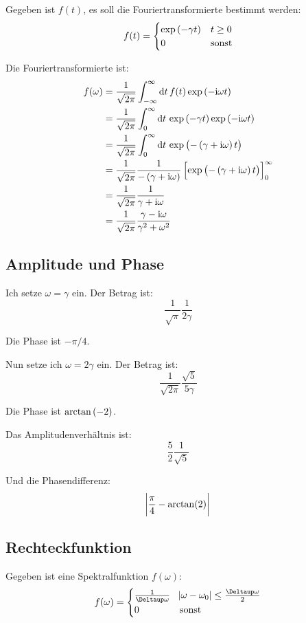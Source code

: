 Gegeben ist $f(t)$, es soll die Fouriertransformierte bestimmt werden:
\[
	f(t) = \begin{cases}
		\exp\del{-\gamma t} & t \geq 0 \\
									  0 & \text{sonst}
	\end{cases}
\]

Die Fouriertransformierte ist:
\begin{align*}
	f(\omega)
	&= \frac{1}{\sqrt{2 \pi}} \int_{-\infty}^\infty \dif t \, f(t) \exp\del{-\ii \omega t} \\
	&= \frac{1}{\sqrt{2 \pi}} \int_0^\infty \dif t \, \exp\del{-\gamma t} \exp\del{-\ii \omega t} \\
	&= \frac{1}{\sqrt{2 \pi}} \int_0^\infty \dif t \, \exp\del{-\del{\gamma + \ii \omega} t} \\
	&= \frac{1}{\sqrt{2 \pi}} \frac{1}{-\del{\gamma + \ii \omega}} \sbr{\exp\del{-\del{\gamma + \ii \omega} t}}_0^\infty \\
	&= \frac{1}{\sqrt{2 \pi}} \frac{1}{\gamma + \ii \omega} \\
	&= \frac{1}{\sqrt{2 \pi}} \frac{\gamma - \ii \omega}{\gamma^2 + \omega^2} \\
\end{align*}

\subsection{Amplitude und Phase}

Ich setze $\omega = \gamma$ ein. Der Betrag ist:
\[
	\frac{1}{\sqrt{\pi}} \frac{1}{2 \gamma}
\]

Die Phase ist $- \pi / 4$.

Nun setze ich $\omega = 2 \gamma$ ein. Der Betrag ist:
\[
	\frac{1}{\sqrt{2 \pi}} \frac{\sqrt{5}}{5 \gamma}
\]

Die Phase ist $\arctan\del{-2}$.

Das Amplitudenverhältnis ist:
\[
	\frac 52 \frac{1}{\sqrt{5}}
\]

Und die Phasendifferenz:
\[
	\abs{\frac \pi4 - \arctan(2)}
\]

\subsection{Rechteckfunktion}

Gegeben ist eine Spektralfunktion $f(\omega)$:
\[
	f(\omega) = \begin{cases}
		\frac 1{\Deltaup \omega} & \abs{\omega - \omega_0} \leq \frac{\Deltaup \omega}2 \\
											  0 & \text{sonst}
	\end{cases}
\]

